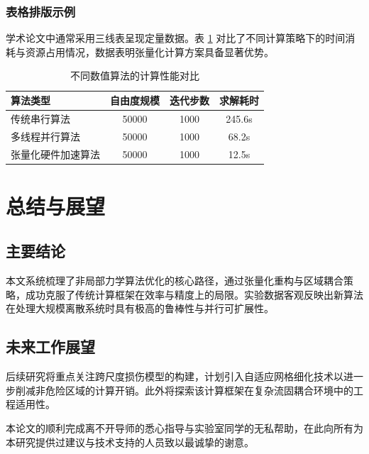 \documentclass{xtu_thesis}
\begin{document}
	\subsubsection{表格排版示例}
	学术论文中通常采用三线表呈现定量数据。表 \ref{tab:performance} 对比了不同计算策略下的时间消耗与资源占用情况，数据表明张量化计算方案具备显著优势。
	
	\begin{table}[htbp]
		\centering
		\caption{不同数值算法的计算性能对比}
		\label{tab:performance}
		\begin{tabular}{lccc}
			\toprule
			算法类型 & 自由度规模 & 迭代步数 & 求解耗时 \\
			\midrule
			传统串行算法 & 50000 & 1000 & 245.6s \\
			多线程并行算法 & 50000 & 1000 & 68.2s \\
			张量化硬件加速算法 & 50000 & 1000 & 12.5s \\
			\bottomrule
		\end{tabular}
		
	\end{table}
	
	\section{总结与展望}
	
	\subsection{主要结论}
	本文系统梳理了非局部力学算法优化的核心路径，通过张量化重构与区域耦合策略，成功克服了传统计算框架在效率与精度上的局限。实验数据客观反映出新算法在处理大规模离散系统时具有极高的鲁棒性与并行可扩展性。
	
	\subsection{未来工作展望}
	后续研究将重点关注跨尺度损伤模型的构建，计划引入自适应网格细化技术以进一步削减非危险区域的计算开销。此外将探索该计算框架在复杂流固耦合环境中的工程适用性。
	
	\begin{referencelist}
	\end{referencelist}
	
	\acknowledgement
	
	本论文的顺利完成离不开导师的悉心指导与实验室同学的无私帮助，在此向所有为本研究提供过建议与技术支持的人员致以最诚挚的谢意。
	
\end{document}
